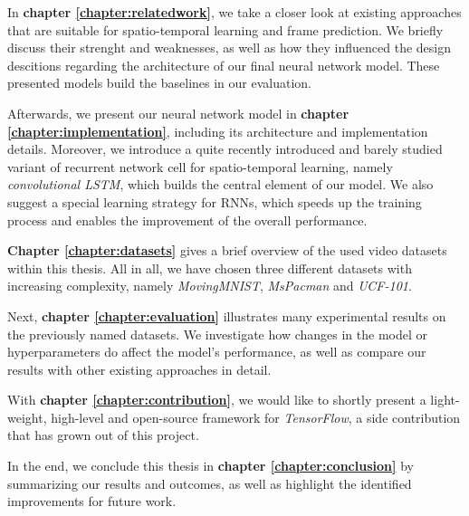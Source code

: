 In \textbf{chapter \ref{chapter:relatedwork}}, we take a closer look at existing approaches that are suitable for spatio-temporal learning and frame prediction. We briefly discuss their strenght and weaknesses, as well as how they influenced the design descitions regarding the architecture of our final neural network model. These presented models build the baselines in our evaluation.

Afterwards, we present our neural network model in \textbf{chapter \ref{chapter:implementation}}, including its architecture and implementation details. Moreover, we introduce a quite recently introduced and barely studied variant of recurrent network cell for spatio-temporal learning, namely \textit{convolutional LSTM}, which builds the central element of our model. We also suggest a special learning strategy for RNNs, which speeds up the training process and enables the improvement of the overall performance.

\textbf{Chapter \ref{chapter:datasets}} gives a brief overview of the used video datasets within this thesis. All in all, we have chosen three different datasets with increasing complexity, namely \textit{MovingMNIST}, \textit{MsPacman} and \textit{UCF-101}.

Next, \textbf{chapter \ref{chapter:evaluation}} illustrates many experimental results on the previously named datasets. We investigate how changes in the model or hyperparameters do affect the model's performance, as well as compare our results with other existing approaches in detail.

With \textbf{chapter \ref{chapter:contribution}}, we would like to shortly present a light-weight, high-level and open-source framework for \textit{TensorFlow}, a side contribution that has grown out of this project.

In the end, we conclude this thesis in \textbf{chapter \ref{chapter:conclusion}} by summarizing our results and outcomes, as well as highlight the identified improvements for future work.



